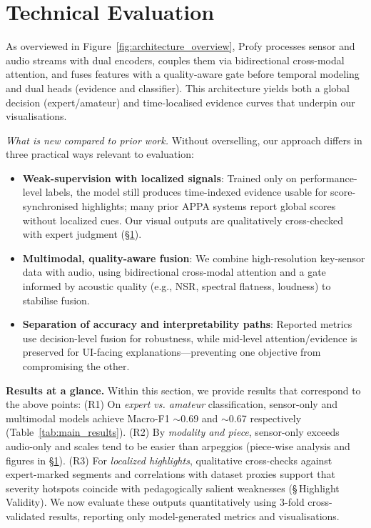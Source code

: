 \documentclass[sigconf,review,anonymous]{acmart}
\begin{document}
\section{Technical Evaluation}\label{sec:technical-eval}

As overviewed in Figure~\ref{fig:architecture_overview}, Profy processes sensor and audio streams with dual encoders, couples them via bidirectional cross-modal attention, and fuses features with a quality-aware gate before temporal modeling and dual heads (evidence and classifier). This architecture yields both a global decision (expert/amateur) and time-localised evidence curves that underpin our visualisations.

\noindent\textit{What is new compared to prior work.}
Without overselling, our approach differs in three practical ways relevant to evaluation:
\begin{itemize}
  \item \textbf{Weak-supervision with localized signals}: Trained only on performance-level labels, the model still produces time-indexed evidence usable for score-synchronised highlights; many prior APPA systems report global scores without localized cues. Our visual outputs are qualitatively cross-checked with expert judgment (\S\ref{sec:technical-eval}).
  \item \textbf{Multimodal, quality-aware fusion}: We combine high-resolution key-sensor data with audio, using bidirectional cross-modal attention and a gate informed by acoustic quality (e.g., NSR, spectral flatness, loudness) to stabilise fusion.
  \item \textbf{Separation of accuracy and interpretability paths}: Reported metrics use decision-level fusion for robustness, while mid-level attention/evidence is preserved for UI-facing explanations—preventing one objective from compromising the other.
\end{itemize}
\noindent\textbf{Results at a glance.}
Within this section, we provide results that correspond to the above points: (R1) On \emph{expert vs. amateur} classification, sensor-only and multimodal models achieve Macro-F1 $\sim$0.69 and $\sim$0.67 respectively (Table~\ref{tab:main_results}). (R2) By \emph{modality and piece}, sensor-only exceeds audio-only and scales tend to be easier than arpeggios (piece-wise analysis and figures in \S\ref{sec:technical-eval}). (R3) For \emph{localized highlights}, qualitative cross-checks against expert-marked segments and correlations with dataset proxies support that severity hotspots coincide with pedagogically salient weaknesses (\S\,Highlight Validity).
We now evaluate these outputs quantitatively using 3-fold cross-validated results, reporting only model-generated metrics and visualisations.
\end{document}
